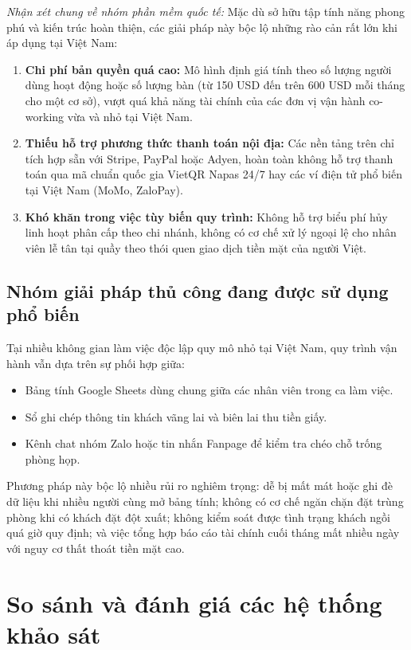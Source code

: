 \textit{Nhận xét chung về nhóm phần mềm quốc tế:} Mặc dù sở hữu tập tính năng phong phú và kiến trúc hoàn thiện, các giải pháp này bộc lộ những rào cản rất lớn khi áp dụng tại Việt Nam:
\begin{enumerate}
    \item \textbf{Chi phí bản quyền quá cao:} Mô hình định giá tính theo số lượng người dùng hoạt động hoặc số lượng bàn (từ 150 USD đến trên 600 USD mỗi tháng cho một cơ sở), vượt quá khả năng tài chính của các đơn vị vận hành co-working vừa và nhỏ tại Việt Nam.
    \item \textbf{Thiếu hỗ trợ phương thức thanh toán nội địa:} Các nền tảng trên chỉ tích hợp sẵn với Stripe, PayPal hoặc Adyen, hoàn toàn không hỗ trợ thanh toán qua mã chuẩn quốc gia VietQR Napas 24/7 hay các ví điện tử phổ biến tại Việt Nam (MoMo, ZaloPay).
    \item \textbf{Khó khăn trong việc tùy biến quy trình:} Không hỗ trợ biểu phí hủy linh hoạt phân cấp theo chi nhánh, không có cơ chế xử lý ngoại lệ cho nhân viên lễ tân tại quầy theo thói quen giao dịch tiền mặt của người Việt.
\end{enumerate}

\subsection{Nhóm giải pháp thủ công đang được sử dụng phổ biến}
Tại nhiều không gian làm việc độc lập quy mô nhỏ tại Việt Nam, quy trình vận hành vẫn dựa trên sự phối hợp giữa:
\begin{itemize}
    \item Bảng tính Google Sheets dùng chung giữa các nhân viên trong ca làm việc.
    \item Sổ ghi chép thông tin khách vãng lai và biên lai thu tiền giấy.
    \item Kênh chat nhóm Zalo hoặc tin nhắn Fanpage để kiểm tra chéo chỗ trống phòng họp.
\end{itemize}
Phương pháp này bộc lộ nhiều rủi ro nghiêm trọng: dễ bị mất mát hoặc ghi đè dữ liệu khi nhiều người cùng mở bảng tính; không có cơ chế ngăn chặn đặt trùng phòng khi có khách đặt đột xuất; không kiểm soát được tình trạng khách ngồi quá giờ quy định; và việc tổng hợp báo cáo tài chính cuối tháng mất nhiều ngày với nguy cơ thất thoát tiền mặt cao.

\section{So sánh và đánh giá các hệ thống khảo sát}
\label{sec:sosanh}

